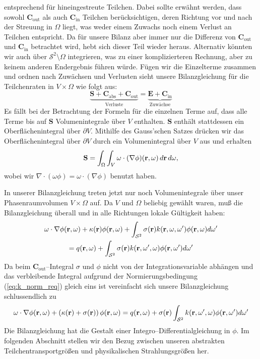 	entsprechend für hineingestreute Teilchen. Dabei sollte erwähnt werden, dass sowohl $\mathbf{C}_\text{out}$ als auch $\mathbf{C}_\text{in}$ Teilchen berücksichtigen, deren Richtung vor und nach der Streuung in $\Omega$ liegt, was weder einem Zuwachs noch einem Verlust an Teilchen entspricht. Da für unsere Bilanz aber immer nur die Differenz von $\mathbf{C}_\text{out}$ und $\mathbf{C}_\text{in}$ betrachtet wird, hebt sich dieser Teil wieder heraus. Alternativ könnten wir auch über $\mathcal{S}^2 \setminus \Omega$ integrieren, was zu einer komplizierteren Rechnung, aber zu keinem anderen Endergebnis führen würde. Fügen wir die Einzelterme zusammen und ordnen nach Zuwächsen und Verlusten sieht unsere Bilanzgleichung für die Teilchenraten in $V \times \Omega$ wie folgt aus:
	$$\underbrace{\mathbf{S}+\mathbf{C}_\text{abs}+\mathbf{C}_\text{out}}_\text{Verluste}=\underbrace{\mathbf{E}+\mathbf{C}_\text{in}}_\text{Zuwächse}$$
	Es fällt bei der Betrachtung der Formeln für die einzelnen Terme auf, dass alle Terme bis auf $\mathbf{S}$ Volumenintegrale über $V$ enthalten. $\mathbf{S}$ enthält stattdessen ein Oberflächenintegral über $\partial V$. Mithilfe des Gauss'schen Satzes drücken wir das Oberflächenintegral über $\partial V$ durch ein Volumenintegral über $V$ aus und erhalten
	$$\mathbf{S}=\int_\Omega \int_V \omega \cdot (\nabla\phi)(\mathbf{r},\omega)\,d\mathbf{r}\,d\omega,$$
	wobei wir $\nabla \cdot(\omega\phi)=\omega\cdot(\nabla\phi)$ benutzt haben.
	
	In unserer Bilanzgleichung treten jetzt nur noch Volumenintegrale über unser Phasenraumvolumen $V \times \Omega$ auf. Da $V$ und $\Omega$ beliebig gewählt waren, muß die Bilanzgleichung überall und in alle Richtungen lokale Gültigkeit haben:
	\begin{multline*}
	  \omega\cdot\nabla\phi(\mathbf{r},\omega)+\kappa(\mathbf{r})\phi(\mathbf{r},\omega)+\int_{\mathcal{S}^2}\sigma(\mathbf{r})k(\mathbf{r},\omega,\omega')\phi(\mathbf{r},\omega)d\omega' \\
	  =q(\mathbf{r},\omega)+\int_{\mathcal{S}^2}\sigma(\mathbf{r})k(\mathbf{r},\omega',\omega)\phi(\mathbf{r},\omega')d\omega'
	\end{multline*}
	Da beim $\mathbf{C}_\text{out}$--Integral $\sigma$ und $\phi$ nicht von der Integrationsvariable abhängen und das verbleibende Integral aufgrund der Normierungsbedingung (\ref{eq:k_norm_req}) gleich eins ist vereinfacht sich unsere Bilanzgleichung schlussendlich zu
	\begin{equation}\label{eq:particle_balance_equation}
	  \omega\cdot\nabla\phi(\mathbf{r},\omega)+\left(\kappa(\mathbf{r})+\sigma(\mathbf{r})\right)\phi(\mathbf{r},\omega)
	  =q(\mathbf{r},\omega)+\sigma(\mathbf{r})\int_{\mathcal{S}^2}k(\mathbf{r},\omega',\omega)\phi(\mathbf{r},\omega')d\omega'
	\end{equation}
	Die Bilanzgleichung hat die Gestalt einer Integro--Differentialgleichung in $\phi$.
	Im folgenden Abschnitt stellen wir den Bezug zwischen unseren abstrakten Teilchentransportgrößen und physikalischen Strahlungsgrößen her.

